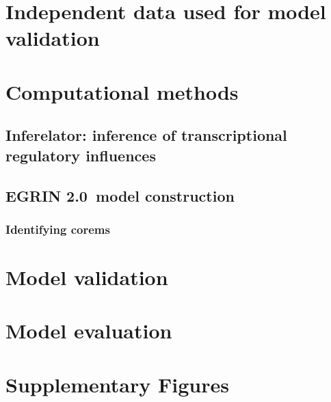 \documentclass[11pt]{article}
\newcommand{\tmsamp}[1]{\textsf{#1}}
\newcommand{\nwinf}{{\tmsamp{Inferelator}}}
\newcommand{\egrine}{{\tmsamp{EGRIN 2.0}}}
\begin{document}


\section{Independent data used for model validation}



\section{Computational methods}



\subsection{\nwinf: inference of transcriptional regulatory influences}



\subsection{\egrine~model construction}



\subsubsection{Identifying corems}





\section{Model validation}\label{sec:validation}



\section{Model evaluation}\label{sec:evaluation}



\section{Supplementary Figures}

\label{suppfigs}


\clearpage %

{}
\end{document}
